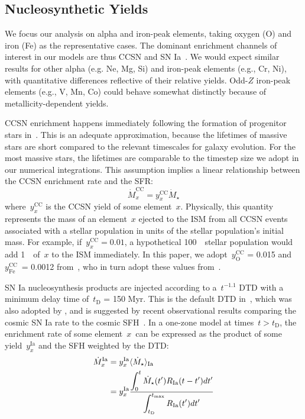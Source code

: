 \documentclass[draft2.tex]{subfiles}
\begin{document}
\subsection{Nucleosynthetic Yields} 
\label{sec:methods:yields} 
We focus our analysis on alpha and iron-peak elements, taking oxygen (O) and 
iron (Fe) as the representative cases. 
The dominant enrichment channels of interest in our models are thus CCSN and 
SN Ia~\citep{Johnson2019}. 
We would expect similar results for other alpha (e.g. Ne, Mg, Si) and 
iron-peak elements (e.g., Cr, Ni), with quantitative differences reflective of 
their relative yields. 
Odd-$Z$ iron-peak elements (e.g., V, Mn, Co) could behave somewhat distinctly 
because of metallicity-dependent yields. 
\par 
CCSN enrichment happens immediately following the formation of progenitor stars 
in~\vice. 
This is an adequate approximation, because the lifetimes of massive stars are 
short compared to the relevant timescales for galaxy evolution. 
For the most massive stars, the lifetimes are comparable to the timestep size 
we adopt in our numerical integrations. 
This assumption implies a linear relationship between the CCSN enrichment 
rate and the SFR: 
\begin{equation} 
\dot{M}_x^\text{CC} = y_x^\text{CC}\dot{M}_\star 
\end{equation} 
where~$y_x^\text{CC}$ is the CCSN yield of some element~$x$. Physically, this 
quantity represents the mass of an element~$x$ ejected to the ISM from all 
CCSN events associated with a stellar population in units of the stellar 
population's initial mass. 
For example, if~$y_x^\text{CC} = 0.01$, a hypothetical 100~\msun~stellar 
population would add 1~\msun~of~$x$ to the ISM immediately. 
In this paper, we adopt~$y_\text{O}^\text{CC}$ = 0.015 and 
$y_\text{Fe}^\text{CC}$~= 0.0012 from~\citet{Johnson2020}, who in turn adopt 
these values from~\citet{Weinberg2017}. 
\par 
SN Ia nucleosynthesis products are injected according to a~$t^{-1.1}$ DTD with 
a minimum delay time of~$t_\text{D}$ = 150 Myr. 
This is the default DTD in~\vice, which was also adopted by 
\citet{Johnson2020}, and is suggested by recent observational results comparing 
the cosmic SN Ia rate to the cosmic SFH~\citep{Maoz2012, Maoz2017}. 
In a one-zone model at times~$t > t_\text{D}$, the enrichment rate of some 
element~$x$~can be expressed as the product of some yield~$y_x^\text{Ia}$ and 
the SFH weighted by the DTD: 
\begin{subequations}\begin{align} 
\dot{M}_x^\text{Ia} &= y_x^\text{Ia}\langle\dot{M}_\star\rangle_\text{Ia} \\ 
&= y_x^\text{Ia}\frac{\displaystyle 
	\int_0^t \dot{M}_\star(t') R_\text{Ia}(t - t') dt' 
}{\displaystyle 
	\int_{t_\text{D}}^{t_\text{max}} R_\text{Ia}(t')dt' 
} 
\label{eq:mdot_ia} 
\end{align}\end{subequations} 
\end{document}
